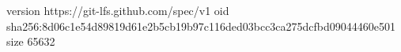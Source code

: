 version https://git-lfs.github.com/spec/v1
oid sha256:8d06c1e54d89819d61e2b5cb19b97c116ded03bcc3ca275dcfbd09044460e501
size 65632

